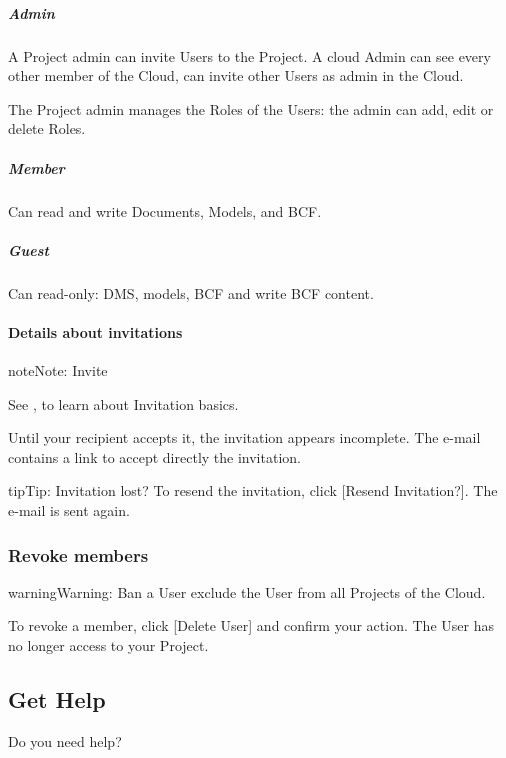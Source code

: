 \documentclass[a4paper,12pt,english]{sphinxmanual}
\begin{document}
\subparagraph{Admin}
\label{\detokenize{platform/collaborate:admin}}
A Project admin can invite Users to the Project.
A cloud Admin can see every other member of the Cloud, can invite other Users as admin in the Cloud.

The Project admin manages the Roles of the Users: the admin can add, edit or delete Roles.


\subparagraph{Member}
\label{\detokenize{platform/collaborate:member}}
Can read and write Documents, Models, and BCF.


\subparagraph{Guest}
\label{\detokenize{platform/collaborate:guest}}
Can read-only: DMS, models, BCF and write BCF content.


\paragraph{Details about invitations}
\label{\detokenize{platform/collaborate:details-about-invitations}}
\begin{sphinxadmonition}{note}{Note:}
Invite

See , to learn about Invitation basics.
\end{sphinxadmonition}

Until your recipient accepts it, the invitation appears incomplete.
The e-mail contains a link to accept directly the invitation.

\begin{sphinxadmonition}{tip}{Tip:}
Invitation lost?
To resend the invitation, click {[}Resend Invitation?{]}. The e-mail is sent again.

\noindent{}
\end{sphinxadmonition}


\subsubsection{Revoke members}
\label{\detokenize{platform/collaborate:revoke-members}}
\begin{sphinxadmonition}{warning}{Warning:}
Ban a User exclude the User from all Projects of the Cloud.
\end{sphinxadmonition}

To revoke a member, click {[}Delete User{]} and confirm your action. The User has no longer access to your Project.


\subsection{Get Help}
\label{\detokenize{get_help:get-help}}\label{\detokenize{get_help::doc}}
Do you need help?
\end{document}
